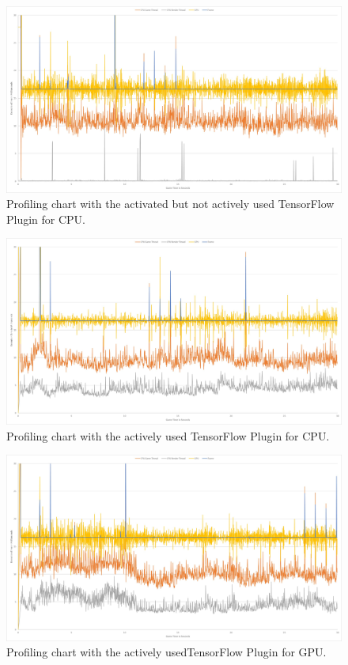 \documentclass[MGS,Master,english]{twbook}%
\begin{document}
\begin{figure}[!ht]
	\centering
	\includegraphics[width=1.0\linewidth]{PICs/Profiling/activated_plugin_no_tf_used}
	\caption{Profiling chart with the activated but not actively used TensorFlow Plugin for CPU.}
\end{figure}

\begin{figure}[!ht]
	\centering
	\includegraphics[width=1.0\linewidth]{PICs/Profiling/tf_cpu}
	\caption{Profiling chart with the actively used TensorFlow Plugin for CPU.}
\end{figure}

\begin{figure}[!ht]
	\centering
	\includegraphics[width=1.0\linewidth]{PICs/Profiling/tf_gpu}
	\caption{Profiling chart with the actively usedTensorFlow Plugin for GPU.}
\end{figure}
\end{document}
